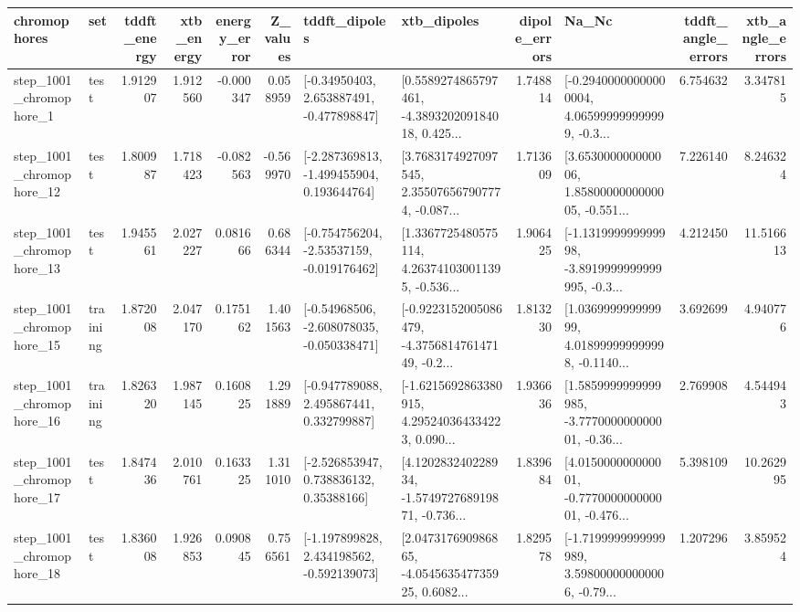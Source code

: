 \begin{tabular}{llrrrrllrlrr}
\toprule
             chromophores &       set &  tddft\_energy &  xtb\_energy &  energy\_error &  Z\_values &                               tddft\_dipoles &                                        xtb\_dipoles &  dipole\_errors &                                              Na\_Nc &  tddft\_angle\_errors &  xtb\_angle\_errors \\
\midrule
  step\_1001\_chromophore\_1 &      test &      1.912907 &    1.912560 &     -0.000347 &  0.058959 &    [-0.34950403, 2.653887491, -0.477898847] &  [0.5589274865797461, -4.389320209184018, 0.425... &       1.748814 &  [-0.29400000000000004, 4.065999999999999, -0.3... &            6.754632 &          3.347815 \\
 step\_1001\_chromophore\_12 &      test &      1.800987 &    1.718423 &     -0.082563 & -0.569970 &   [-2.287369813, -1.499455904, 0.193644764] &  [3.7683174927097545, 2.355076567907774, -0.087... &       1.713609 &  [3.653000000000006, 1.8580000000000005, -0.551... &            7.226140 &          8.246324 \\
 step\_1001\_chromophore\_13 &      test &      1.945561 &    2.027227 &      0.081666 &  0.686344 &   [-0.754756204, -2.53537159, -0.019176462] &  [1.3367725480575114, 4.263741030011395, -0.536... &       1.906425 &  [-1.131999999999998, -3.8919999999999995, -0.3... &            4.212450 &         11.516613 \\
 step\_1001\_chromophore\_15 &  training &      1.872008 &    2.047170 &      0.175162 &  1.401563 &   [-0.54968506, -2.608078035, -0.050338471] &  [-0.9223152005086479, -4.375681476147149, -0.2... &       1.813230 &  [1.036999999999999, 4.018999999999998, -0.1140... &            3.692699 &          4.940776 \\
 step\_1001\_chromophore\_16 &  training &      1.826320 &    1.987145 &      0.160825 &  1.291889 &    [-0.947789088, 2.495867441, 0.332799887] &  [-1.6215692863380915, 4.295240364334223, 0.090... &       1.936636 &  [1.5859999999999985, -3.777000000000001, -0.36... &            2.769908 &          4.544943 \\
 step\_1001\_chromophore\_17 &      test &      1.847436 &    2.010761 &      0.163325 &  1.311010 &     [-2.526853947, 0.738836132, 0.35388166] &  [4.120283240228934, -1.574972768919871, -0.736... &       1.839684 &  [4.015000000000001, -0.777000000000001, -0.476... &            5.398109 &         10.262995 \\
 step\_1001\_chromophore\_18 &      test &      1.836008 &    1.926853 &      0.090845 &  0.756561 &   [-1.197899828, 2.434198562, -0.592139073] &  [2.047317690986865, -4.054563547735925, 0.6082... &       1.829578 &  [-1.7199999999999989, 3.598000000000006, -0.79... &            1.207296 &          3.859524 \\

\end{tabular}
